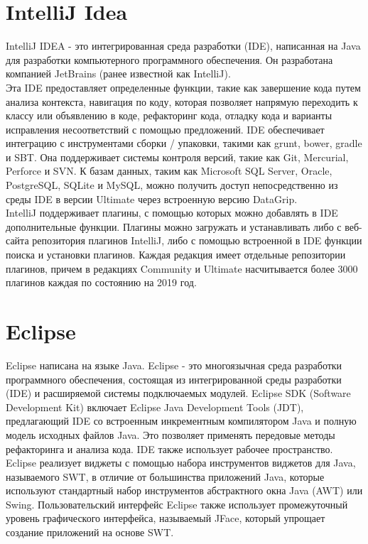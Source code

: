 \section{IntelliJ Idea}
IntelliJ IDEA - это интегрированная среда разработки (IDE), написанная на Java для разработки 
компьютерного программного обеспечения. Он разработана компанией JetBrains (ранее известной как 
IntelliJ).\\

Эта IDE предоставляет определенные функции, такие как завершение кода путем анализа контекста, 
навигация по коду, которая позволяет напрямую переходить к классу или объявлению в коде, 
рефакторинг кода, отладку кода и варианты исправления несоответствий с помощью предложений.
IDE обеспечивает интеграцию с инструментами сборки / упаковки, такими как grunt, bower, gradle и 
SBT. Она поддерживает системы контроля версий, такие как Git, Mercurial, Perforce и SVN. К базам 
данных, таким как Microsoft SQL Server, Oracle, PostgreSQL, SQLite и MySQL, можно получить доступ
непосредственно из среды IDE в версии Ultimate через встроенную версию DataGrip.\\

IntelliJ поддерживает плагины, с помощью которых можно добавлять в IDE дополнительные функции. 
Плагины можно загружать и устанавливать либо с веб-сайта репозитория плагинов IntelliJ, либо с 
помощью встроенной в IDE функции поиска и установки плагинов. Каждая редакция имеет отдельные 
репозитории плагинов, причем в редакциях Community и Ultimate насчитывается более 3000 плагинов 
каждая по состоянию на 2019 год.\\

\section{Eclipse}
Eclipse написана на языке Java. Eclipse - это многоязычная среда разработки программного 
обеспечения, состоящая из интегрированной среды разработки (IDE) и расширяемой системы подключаемых
модулей. Eclipse SDK (Software Development Kit) включает Eclipse Java Development Tools (JDT), 
предлагающий IDE со встроенным инкрементным компилятором Java и полную модель исходных файлов Java. 
Это позволяет применять передовые методы рефакторинга и анализа кода. IDE также использует рабочее
пространство. Eclipse реализует виджеты с помощью набора инструментов виджетов для Java, называемого 
SWT, в отличие от большинства приложений Java, которые используют стандартный набор инструментов
абстрактного окна Java (AWT) или Swing. Пользовательский интерфейс Eclipse также использует 
промежуточный уровень графического интерфейса, называемый JFace, который упрощает создание 
приложений на основе SWT.\\

